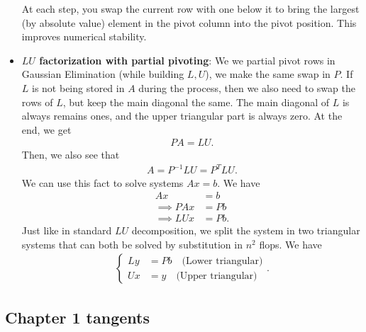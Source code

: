 \documentclass{report}
\begin{document}
\begin{itemize}
        At each step, you swap the current row with one below it to bring the largest (by absolute value) element in the pivot column into the pivot position. This improves numerical stability.
    \item \textbf{$LU$ factorization with partial pivoting}: We we partial pivot rows in Gaussian Elimination (while building $L,U$), we make the same swap in $P$. If $L$ is not being stored in $A$ during the process, then we also need to swap the rows of $L$, but keep the main diagonal the same. The main diagonal of $L$ is always remains ones, and the upper triangular part is always zero. 
        \bigbreak \noindent 
        At the end, we get
        \begin{align*}
            PA = LU
        .\end{align*}
        Then, we also see that
        \begin{align*}
            A = P^{-1}LU = P^{T}LU
        .\end{align*}
        We can use this fact to solve systems $Ax = b$. We have
        \begin{align*}
            Ax &= b \\
            \implies PAx &= Pb \\
            \implies LUx &= Pb
        .\end{align*}
        Just like in standard $LU$ decomposition, we split the system in two triangular systems that can both be solved by substitution in $n^{2}$ flops. We have
        \begin{align*}
            \begin{cases}
                Ly &= Pb  \quad \text{(Lower triangular)}\\
                Ux &= y \quad \text{(Upper triangular)}
            \end{cases}
        .\end{align*}


\end{itemize}

    \pagebreak 
    \subsection{Chapter 1 tangents}
    \bigbreak \noindent 
\end{document}
